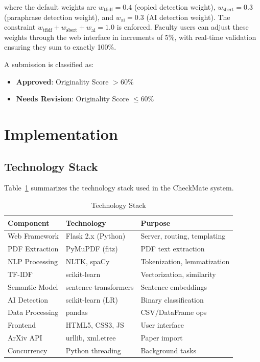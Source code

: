 \documentclass[conference]{IEEEtran}
\begin{document}
\noindent where the default weights are $w_{\text{tfidf}} = 0.4$ (copied detection weight), $w_{\text{sbert}} = 0.3$ (paraphrase detection weight), and $w_{\text{ai}} = 0.3$ (AI detection weight). The constraint $w_{\text{tfidf}} + w_{\text{sbert}} + w_{\text{ai}} = 1.0$ is enforced. Faculty users can adjust these weights through the web interface in increments of 5\%, with real-time validation ensuring they sum to exactly 100\%.

A submission is classified as:
\begin{itemize}
\item \textbf{Approved}: Originality Score $> 60\%$
\item \textbf{Needs Revision}: Originality Score $\leq 60\%$
\end{itemize}

\section{Implementation}

\subsection{Technology Stack}

Table~\ref{tab_tech} summarizes the technology stack used in the CheckMate system.

\begin{table}[htbp]
\caption{Technology Stack}
\begin{center}
\begin{tabular}{|p{2.2cm}|p{2.8cm}|p{2.5cm}|}
\hline
\textbf{Component} & \textbf{Technology} & \textbf{Purpose} \\
\hline
Web Framework & Flask 2.x (Python) & Server, routing, templating \\
\hline
PDF Extraction & PyMuPDF (fitz) & PDF text extraction \\
\hline
NLP Processing & NLTK, spaCy & Tokenization, lemmatization \\
\hline
TF-IDF & scikit-learn & Vectorization, similarity \\
\hline
Semantic Model & sentence-transformers & Sentence embeddings \\
\hline
AI Detection & scikit-learn (LR) & Binary classification \\
\hline
Data Processing & pandas & CSV/DataFrame ops \\
\hline
Frontend & HTML5, CSS3, JS & User interface \\
\hline
ArXiv API & urllib, xml.etree & Paper import \\
\hline
Concurrency & Python threading & Background tasks \\
\hline
\end{tabular}
\label{tab_tech}
\end{center}
\end{table}
\end{document}
